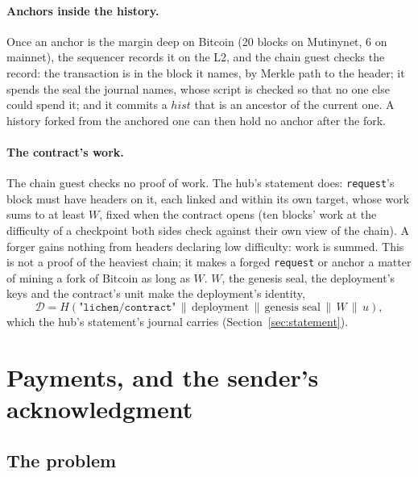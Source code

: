 \documentclass[11pt]{article}
\newcommand{\tx}[1]{\texttt{#1}}
\begin{document}
\paragraph{Anchors inside the history.} Once an anchor is the margin
deep on Bitcoin (20 blocks on Mutinynet, 6 on mainnet), the sequencer
records it on the L2, and the chain guest checks the record: the
transaction is in the block it names, by Merkle path to the header; it
spends the seal the journal names, whose script is checked so that no
one else could spend it; and it commits a $\mathit{hist}$ that is an
ancestor of the current one. A history forked from the anchored one can
then hold no anchor after the fork.

\paragraph{The contract's work.} The chain guest checks no proof of
work. The hub's statement does: \tx{request}'s block must have headers
on it, each linked and within its own target, whose work sums to at
least $W$, fixed when the contract opens (ten blocks' work at the
difficulty of a checkpoint both sides check against their own view of
the chain). A forger gains nothing from headers declaring low
difficulty: work is summed. This is not a proof of the heaviest chain;
it makes a forged \tx{request} or anchor a matter of mining a fork of
Bitcoin as long as $W$. $W$, the genesis seal, the deployment's keys and
the contract's unit make the deployment's identity,
\[
  \mathcal{D} = H(\texttt{"lichen/contract"} \,\|\, \text{deployment} \,\|\, \text{genesis seal} \,\|\, W \,\|\, u),
\]
which the hub's statement's journal carries (Section~\ref{sec:statement}).

\section{Payments, and the sender's acknowledgment}
\label{sec:ack}

\subsection{The problem}
\end{document}
